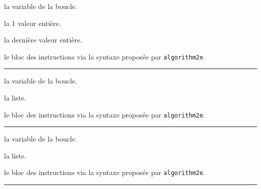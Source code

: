 \documentclass[12pt,a4paper]{article}
\theoremstyle{definition}
\newcommand\separation{
    \medskip
    \hfill\rule{0.5\textwidth}{0.75pt}\hfill
    \medskip
}
\newcommand\extraspace{
    \vspace{0.25em}
}
\begin{document}




 la variable de la boucle.

 la 1\ier{} valeur entière.

 la dernière valeur entière.

 le bloc des instructions via la syntaxe proposée par \verb#algorithm2e#.




\separation





 la variable de la boucle.

 la liste.

 le bloc des instructions via la syntaxe proposée par \verb#algorithm2e#.




\separation





 la variable de la boucle.

 la liste.

 le bloc des instructions via la syntaxe proposée par \verb#algorithm2e#.




\separation




\extraspace



\extraspace



\extraspace



\extraspace




\end{document}
